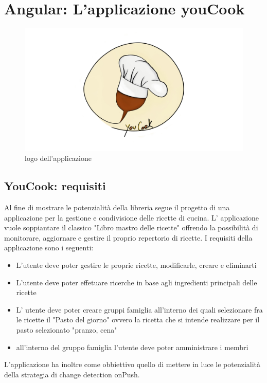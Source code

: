 \chapter{Angular: L'applicazione youCook}
\begin{figure}[H]
    \centering
 \includegraphics[scale=0.2]{resources/youCook_logo.jpg}
   \caption{logo dell'applicazione}
\end{figure}
\newpage
\section{YouCook: requisiti}
Al fine di mostrare le potenzialità della libreria segue il progetto di una applicazione per la gestione e condivisione delle ricette di cucina.
L' applicazione vuole soppiantare il classico "Libro mastro delle ricette" offrendo la possibilità di monitorare, aggiornare e gestire il proprio repertorio di ricette.
I requisiti della applicazione sono i seguenti:
\begin{itemize}
    \item L'utente deve poter gestire le proprie ricette, modificarle, creare e eliminarti
    \item L'utente deve poter effetuare ricerche in base agli ingredienti principali delle ricette
    \item L' utente deve poter creare gruppi famiglia all'interno dei quali selezionare fra le ricette il "Pasto del giorno" ovvero la ricetta che si intende realizzare per il pasto selezionato "pranzo, cena"
    \item all'interno del gruppo famiglia l'utente deve poter amministrare i membri 
    
\end{itemize}
L'applicazione ha inoltre come obbiettivo quello di mettere in luce le potenzialità della strategia di change detection onPush.
\newpage
